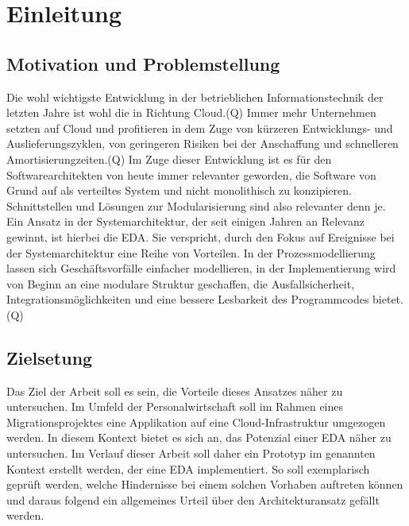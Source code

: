 \section{Einleitung}


\subsection{Motivation und Problemstellung}
Die wohl wichtigste Entwicklung in der betrieblichen Informationstechnik der letzten Jahre ist wohl die in Richtung Cloud.(Q) Immer mehr Unternehmen setzten auf Cloud und profitieren in dem Zuge von kürzeren Entwicklungs- und Auslieferungszyklen, von geringeren Risiken bei der Anschaffung und schnelleren Amortisierungzeiten.(Q) Im Zuge dieser Entwicklung ist es für den Softwarearchitekten von heute immer relevanter geworden, die Software von Grund auf als verteiltes System und nicht monolithisch zu konzipieren. Schnittstellen und Lösungen zur Modularisierung sind also relevanter denn je. \\
Ein Ansatz in der Systemarchitektur, der seit einigen Jahren an Relevanz gewinnt, ist hierbei die \ac{EDA}. Sie verspricht, durch den Fokus auf Ereignisse bei der Systemarchitektur eine Reihe von Vorteilen. In der Prozessmodellierung lassen sich Geschäftsvorfälle einfacher modellieren, in der Implementierung wird von Beginn an eine modulare Struktur geschaffen, die Ausfallsicherheit, Integrationsmöglichkeiten und eine bessere Lesbarkeit des Programmcodes bietet.(Q)

\subsection{Zielsetung}
Das Ziel der Arbeit soll es sein, die Vorteile dieses Ansatzes näher zu untersuchen. Im Umfeld der Personalwirtschaft soll im Rahmen eines Migrationsprojektes eine Applikation auf eine Cloud-Infrastruktur umgezogen werden. In diesem Kontext bietet es sich an, das Potenzial einer \ac{EDA} näher zu untersuchen. Im Verlauf dieser Arbeit soll daher ein Prototyp im genannten Kontext erstellt werden, der eine \ac{EDA} implementiert. So soll exemplarisch geprüft werden, welche Hindernisse bei einem solchen Vorhaben auftreten können und daraus folgend ein allgemeines Urteil über den Architekturansatz gefällt werden.

